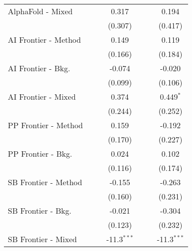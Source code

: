 \begin{tabular}{lcccccc}
   AlphaFold - Mixed    &               &               & 0.317         &               &               & 0.194\\   
                        &               &               & (0.307)       &               &               & (0.417)\\   
   AI Frontier - Method &               &               & 0.149         &               &               & 0.119\\   
                        &               &               & (0.166)       &               &               & (0.184)\\   
   AI Frontier - Bkg.   &               &               & -0.074        &               &               & -0.020\\   
                        &               &               & (0.099)       &               &               & (0.106)\\   
   AI Frontier - Mixed  &               &               & 0.374         &               &               & 0.449$^{*}$\\   
                        &               &               & (0.244)       &               &               & (0.252)\\   
   PP Frontier - Method &               &               & 0.159         &               &               & -0.192\\   
                        &               &               & (0.170)       &               &               & (0.227)\\   
   PP Frontier - Bkg.   &               &               & 0.024         &               &               & 0.102\\   
                        &               &               & (0.116)       &               &               & (0.174)\\   
   SB Frontier - Method &               &               & -0.155        &               &               & -0.263\\   
                        &               &               & (0.160)       &               &               & (0.231)\\   
   SB Frontier - Bkg.   &               &               & -0.021        &               &               & -0.304\\   
                        &               &               & (0.123)       &               &               & (0.232)\\   
   SB Frontier - Mixed  &               &               & -11.3$^{***}$ &               &               & -11.3$^{***}$\\   

\end{tabular}
